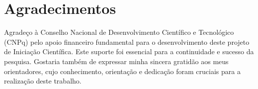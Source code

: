 \section*{Agradecimentos}

Agradeço à Conselho Nacional de Desenvolvimento Científico e Tecnológico (CNPq) pelo apoio financeiro fundamental para o desenvolvimento deste projeto de Iniciação Científica. Este suporte foi essencial para a continuidade e sucesso da pesquisa. Gostaria também de expressar minha sincera gratidão aos meus orientadores, cujo conhecimento, orientação e dedicação foram cruciais para a realização deste trabalho.